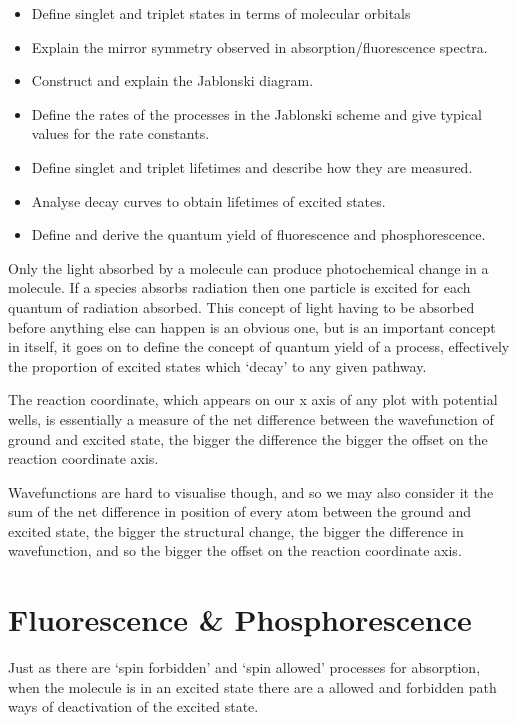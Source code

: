\documentclass[
]{book}
\begin{document}
\begin{itemize}
\item
  Define singlet and triplet states in terms of molecular orbitals
\item
  Explain the mirror symmetry observed in absorption/fluorescence spectra.
\item
  Construct and explain the Jablonski diagram.
\item
  Define the rates of the processes in the Jablonski scheme and give typical values for the rate constants.
\item
  Define singlet and triplet lifetimes and describe how they are measured.
\item
  Analyse decay curves to obtain lifetimes of excited states.
\item
  Define and derive the quantum yield of fluorescence and phosphorescence.
\end{itemize}

Only the light absorbed by a molecule can produce photochemical change in a molecule. If a species absorbs radiation then one particle is excited for each quantum of radiation absorbed. This concept of light having to be absorbed before anything else can happen is an obvious one, but is an important concept in itself, it goes on to define the concept of quantum yield of a process, effectively the proportion of excited states which `decay' to any given pathway.

The reaction coordinate, which appears on our x axis of any plot with potential wells, is essentially a measure of the net difference between the wavefunction of ground and excited state, the bigger the difference the bigger the offset on the reaction coordinate axis.

Wavefunctions are hard to visualise though, and so we may also consider it the sum of the net difference in position of every atom between the ground and excited state, the bigger the structural change, the bigger the difference in wavefunction, and so the bigger the offset on the reaction coordinate axis.

\hypertarget{sec:FluorPhos}{%
\section{Fluorescence \& Phosphorescence}\label{sec:FluorPhos}}

Just as there are `spin forbidden' and `spin allowed' processes for absorption, when the molecule is in an excited state there are a allowed and forbidden path ways of deactivation of the excited state.
\end{document}
